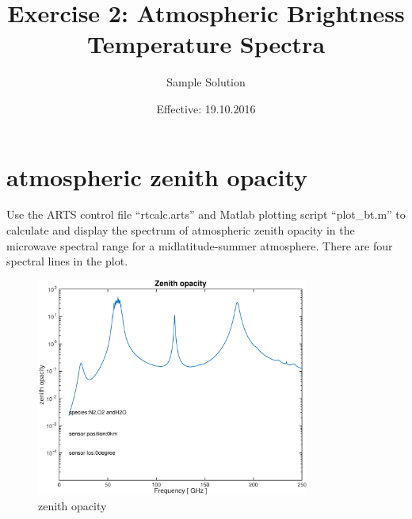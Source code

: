\documentclass[paper=a4, fontsize=11pt]{scrartcl} %
\title{Exercise 2: Atmospheric Brightness Temperature Spectra}
\author{Sample Solution}
\date{Effective: 19.10.2016}
\begin{document}
\maketitle

\section{atmospheric zenith opacity}

Use the ARTS control file ``rtcalc.arts'' and Matlab plotting script ``plot\_bt.m'' to calculate and display the spectrum of atmospheric zenith opacity in the microwave spectral range for a midlatitude-summer atmosphere. There are four spectral lines in the plot. 

\begin{figure}[h!]
\centering
 \includegraphics[width=0.8\textwidth]{plots/opacity_N2+O2+H2O_0km_0deg.pdf}
 \caption{zenith opacity}
\end{figure}
\end{document}
